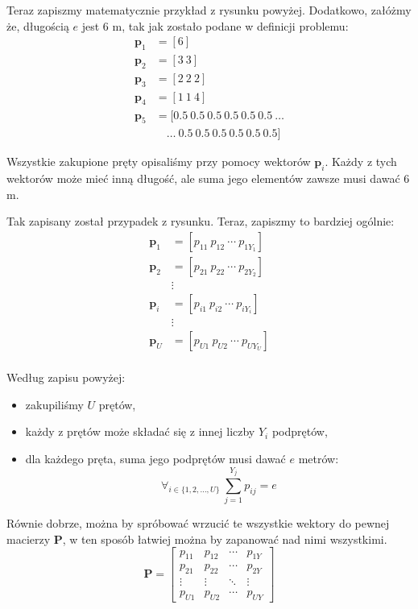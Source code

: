 \documentclass[11pt]{article}
\begin{document}
{Teraz zapiszmy matematycznie przykład z rysunku powyżej. Dodatkowo, załóżmy że, długością $e$ jest 6 m, tak jak zostało podane w definicji problemu:
\begin{align*}
\mathbf{p}_1 &= \left[ 6 \right] \\
\mathbf{p}_2 &= \left[ 3 \ 3 \right] \\
\mathbf{p}_3 &= \left[ 2 \ 2 \ 2 \right] \\
\mathbf{p}_4 &= \left[ 1 \ 1 \ 4 \right] \\
\mathbf{p}_5 &= [ 0.5 \ 0.5 \ 0.5 \ 0.5 \ 0.5 \ 0.5 \ \ldots \\
& \quad \ldots \ 0.5 \ 0.5 \ 0.5 \ 0.5 \ 0.5 \ 0.5 ]
\end{align*}

Wszystkie zakupione pręty opisaliśmy przy pomocy wektorów $\mathbf{p}_i$. Każdy z tych wektorów może mieć inną długość, ale suma jego elementów zawsze musi dawać 6 m.

Tak zapisany został przypadek z rysunku. Teraz, zapiszmy to bardziej ogólnie:
\begin{align*}
\mathbf{p}_1 &= \left[ p_{11} \ p_{12} \ \cdots \ p_{1Y_1} \right] \\
\mathbf{p}_2 &= \left[ p_{21} \ p_{22} \ \cdots \ p_{2Y_2} \right] \\
& \vdots \\
\mathbf{p}_i &= \left[ p_{i1} \ p_{i2} \ \cdots \ p_{iY_i} \right] \\
& \vdots \\
\mathbf{p}_U &= \left[ p_{U1} \ p_{U2} \ \cdots \ p_{UY_U} \right] \\
\end{align*}

Według zapisu powyżej:
\begin{itemize}[--]
\item zakupiliśmy $U$ prętów,
\item każdy z prętów może składać się z innej liczby $Y_i$ podprętów,
\item dla każdego pręta, suma jego podprętów musi dawać $e$ metrów:
\begin{equation*}
\forall_{i \in \{1, 2, \ldots, U\}} \ \sum_{j = 1}^{Y_j} p_{ij} = e
\end{equation*}
\end{itemize}

Równie dobrze, można by spróbować wrzucić te wszystkie wektory do pewnej macierzy $\mathbf{P}$, w ten sposób łatwiej można by zapanować nad nimi wszystkimi.
\begin{equation*}
\mathbf{P} = 
\begin{bmatrix}
p_{11} & p_{12} & \cdots & p_{1Y} \\
p_{21} & p_{22} & \cdots & p_{2Y} \\
\vdots  & \vdots  & \ddots & \vdots  \\
p_{U1} & p_{U2} & \cdots & p_{UY}
\end{bmatrix}
\end{equation*}

}
\end{document}
